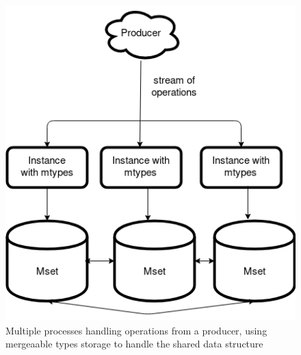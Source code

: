 \documentclass{article}
\begin{document}
\begin{figure}[h]
\centering
\caption{Multiple processes handling operations from a producer, using mergeaable types storage to handle the shared data structure}
\includegraphics[width=0.3\textheight]{benchmark-mtyped.png}
\end{figure}
\end{document}
